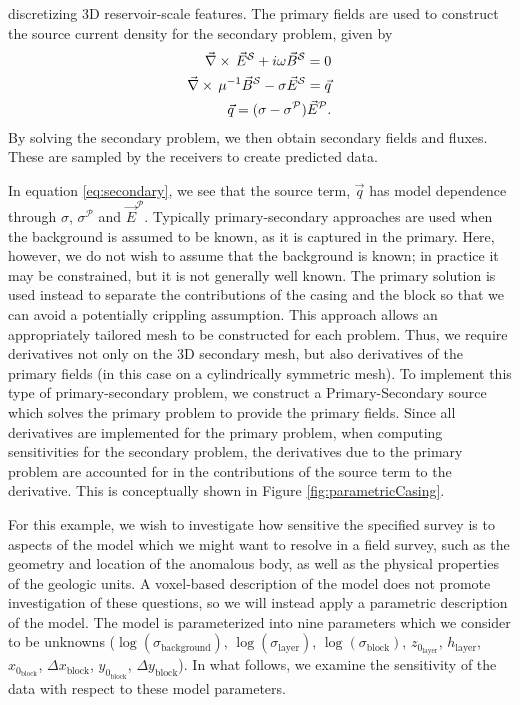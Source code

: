 discretizing 3D reservoir-scale features. The primary fields are used to
construct the source current density for the secondary problem, given by
\begin{equation}
\begin{split}
    {\vec \nabla}\times\, \vec{E}^{\mathcal{S}} + i \omega \vec{B}^{\mathcal{S}} = 0 \\
    {\vec \nabla}\times\, \mu^{-1}\vec{B}^{\mathcal{S}} - \sigma \vec{E}^{\mathcal{S}} = \vec{q} \\
    \vec{q} =  (\sigma - \sigma^{\mathcal{P}}) \vec{E}^{\mathcal{P}}.
\end{split}
\label{eq:secondary}
\end{equation}
By solving the secondary problem, we then obtain secondary fields and fluxes.
These are sampled by the receivers to create predicted data.

In equation \ref{eq:secondary}, we see that the source term, $\vec{q}$ has
model dependence through $\sigma$, $\sigma^{\mathcal{P}}$ and
$\vec{E}^{\mathcal{P}}$. Typically primary-secondary approaches are used when
the background is assumed to be known, as it is captured in the primary. Here,
however, we do not wish to assume that the background is known; in practice
it may be constrained, but it is not generally well known. The primary solution
is used instead to separate the contributions of the casing and the block
so that we can avoid a potentially crippling assumption. This approach allows
an appropriately tailored mesh to be constructed for each problem. Thus, we
require derivatives not only on the 3D secondary mesh, but also derivatives of
the primary fields (in this case on a cylindrically symmetric mesh). To
implement this type of primary-secondary problem, we construct a
Primary-Secondary source which solves the primary problem to provide the primary
fields. Since all derivatives are implemented for the primary problem, when
computing sensitivities for the secondary problem, the derivatives due to the
primary problem are accounted for in the contributions of the source term to
the derivative. This is conceptually shown in Figure \ref{fig:parametricCasing}.

For this example, we wish to investigate how sensitive the specified survey is
to aspects of the model which we might want to resolve in a field survey, such
as the geometry and location of the anomalous body, as well as the physical
properties of the geologic units. A  voxel-based description of the model does
not promote investigation of these questions, so we will instead apply a
parametric description of the model. The model is parameterized into nine
parameters which we consider to be unknowns
($\log(\sigma_{\text{background}})$, $\log(\sigma_{\text{layer}})$,
$\log(\sigma_{\text{block}})$, $z_{0 _{\text{layer}}}$, $h_{\text{layer}}$,
$x_{0_{\text{block}}}$, $\Delta x_{\text{block}}$, $y_{0_{\text{block}}}$,
$\Delta y_{\text{block}}$). In what follows, we examine the sensitivity of the
data with respect to these model parameters.

